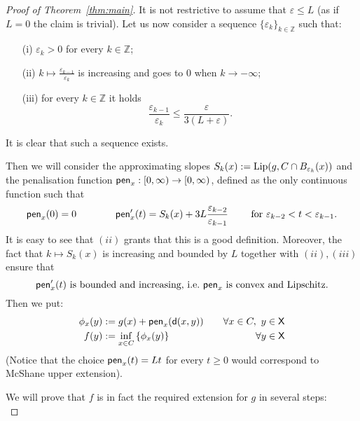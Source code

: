 \documentclass[9pt,reqno]{amsart}
\newcommand{\sfd}{{\sf d}}
\newcommand{\X}{{\sf X}}
\newcommand{\f}{{\sf pen}}
\def\ep{\varepsilon}
\begin{document}
\begin{proof}[Proof of Theorem~\ref{thm:main}] It is not restrictive  to assume that $\ep\leq  L$ (as if $L=0$ the claim is trivial). Let us now consider a sequence $\{ \ep_k \}_{k \in \mathbb{Z}}$ such that:
\begin{itemize} 
\item[(i)] $\ep_k> 0$ for every $k\in\mathbb Z$; %
\item[(ii)] $k\mapsto\frac{\ep_{k-1}}{\ep_k} $ is increasing and goes to 0 when $k \to -\infty$;
\item[(iii)] for every $k \in \mathbb{Z}$ it holds
\begin{equation}\label{eqn:rappep}
\frac{ \ep_{k-1} }{\ep_k} \leq \frac \ep{3(L+\ep)}.
\end{equation}
\end{itemize} 
It is clear that such a sequence exists.

Then we will consider the  approximating slopes $S_k (x) := {\rm Lip} (g, C\cap B_{\ep_k} ( x))$ and the penalisation function  $ \f_x : [0,\infty) \to [0, \infty)$, defined as the only continuous function such that
\begin{equation}\label{eqn:deffx}
\f_x(0)=0 \qquad \qquad \f'_x(t) = S_k(x) + 3 L \frac{ \ep_{k-2}}{\ep_{k-1}} \qquad \text{ for }\ep_{k-2} < t < \ep_{k-1}.
\end{equation}
It is easy to see that  $(ii)$ grants that this is a good definition. Moreover, the fact that $k\mapsto S_k(x)$ is increasing and bounded by $L$ together with $(ii),(iii)$ ensure that
\begin{equation}
\label{eq:penconv}
\f'_x(t)\ \text{is bounded and increasing, i.e.\ $\f_x$ is convex and Lipschitz}.
\end{equation}
Then we put:
\begin{equation}\label{eqn:deff}
\begin{split}
\phi_x (y)&: = g(x) + \f_x ( \sfd(x,y))\qquad\forall x\in C,\ y\in \X \\
 f(y)&:= \inf_{x \in C} \left\{ \phi_x(y) \right\}\qquad\qquad\qquad\qquad\ \ \forall  y\in \X
\end{split}
\end{equation}
(Notice that the choice $\f_x(t) = L  t$ for every $t\geq 0$ would correspond to  McShane upper extension).
  
We will prove that $f$ is in fact the required extension for $g$ in several steps:\\


\end{proof}
\end{document}
